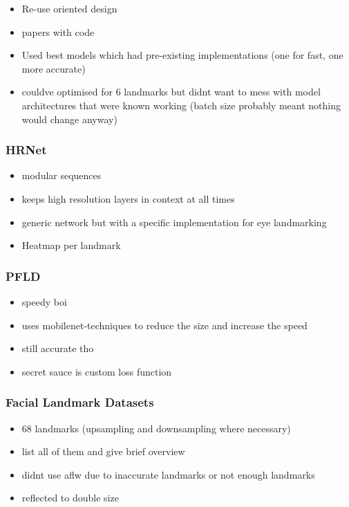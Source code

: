 \begin{itemize}
    \item Re-use oriented design
    \item papers with code
    \item Used best models which had pre-existing implementations (one for fast, one more accurate)
    \item couldve optimised for 6 landmarks but didnt want to mess with model architectures that were known working (batch size probably meant nothing would change anyway)
\end{itemize}

\subsubsection{HRNet}

\begin{itemize}
    \item modular sequences
    \item keeps high resolution layers in context at all times
    \item generic network but with a specific implementation for eye landmarking
    \item Heatmap per landmark
\end{itemize}

\subsubsection{PFLD}

\begin{itemize}
    \item speedy boi
    \item uses mobilenet-techniques to reduce the size and increase the speed
    \item still accurate tho
    \item secret sauce is custom loss function
\end{itemize}

\subsubsection{Facial Landmark Datasets}

\begin{itemize}
    \item 68 landmarks (upsampling and downsampling where necessary)
    \item list all of them and give brief overview
    \item didnt use aflw due to inaccurate landmarks or not enough landmarks
    \item reflected to double size
\end{itemize}

